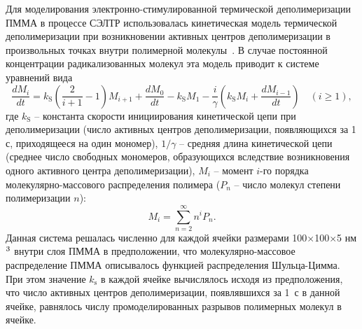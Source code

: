 Для моделирования электронно-стимулированной термической деполимеризации ПММА в процессе СЭЛТР использовалась кинетическая модель термической деполимеризации при возникновении активных центров деполимеризации в произвольных точках внутри полимерной молекулы~\cite{Boyd_3}.
В случае постоянной концентрации радикализованных молекул эта модель приводит к системе уравнений вида
\begin{equation} \label{eq:moment_equation}
	\frac{d M_i}{d t} = k_\mathrm{S} \left(\frac{2}{i+1} - 1\right) M_{i+1} + \frac{d M_0}{d t} - k_\mathrm{S} M_1 - \frac{i}{\gamma}\left(k_\mathrm{S} M_i + \frac{d M_{i-1}}{dt}\right) \quad(i \geq 1),
\end{equation}
где $k_\mathrm{S}$ -- константа скорости инициирования кинетической цепи при деполимеризации (число активных центров деполимеризации, появляющихся за 1 с, приходящееся на один мономер), $1/\gamma$ -- средняя длина кинетической цепи (среднее число свободных мономеров, образующихся вследствие возникновения одного активного центра деполимеризации), $M_i$ -- момент $i$-го порядка молекулярно-массового распределения полимера ($P_n$ -- число молекул степени полимеризации $n$):
\begin{equation}
	M_i=\sum_{n=2}^{\infty} n^i P_n.
\end{equation}
Данная система решалась численно для каждой ячейки размерами 100$\times$100$\times$5 нм$^\text{3}$ внутри слоя ПММА в предположении, что молекулярно-массовое распределение \linebreak ПММА описывалось функцией распределения Шульца-Цимма.
При этом значение $k_\mathrm{s}$ в каждой ячейке вычислялось исходя из предположения, что число активных центров деполимеризации, появлявшихся за 1~с в данной ячейке, равнялось числу промоделированных разрывов полимерных молекул в ячейке.
